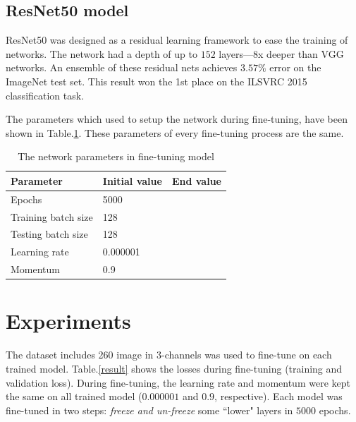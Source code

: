 \documentclass[12pt,a4paper]{article}
\begin{document}
\subsection{ResNet50 model}
ResNet50\cite{he2015deep} was designed as a residual learning framework to ease the training of networks. The network had a depth of up to $152$ layers---$8$x deeper than VGG networks. An ensemble of these residual nets achieves $3.57\%$ error on the ImageNet test set. This result won the 1st place on the ILSVRC 2015 classification task.

The parameters which used to setup the network during fine-tuning, have been shown in Table.\ref{model2parameters}. These parameters of every fine-tuning process are the same.
\begin{table}[h!]
	\centering
	\begin{tabular}{l l l}
	Parameter & Initial value & End value \\ \hline
	Epochs & 5000 &  \\ \hline
	Training batch size & 128 & \\ \hline
	Testing batch size & 128 & \\ \hline
	Learning rate & 0.000001 &  \\ \hline
	Momentum & 0.9 &  \\ \hline
	\end{tabular}
	\caption{The network parameters in fine-tuning model}
	\label{model2parameters}
\end{table}
\section{Experiments}
The dataset includes 260 image in 3-channels was used to fine-tune on each trained model. Table.\ref{result} shows the losses during fine-tuning (training and validation loss). During fine-tuning, the learning rate and momentum were kept the same on all trained model ($0.000001$ and $0.9$, respective). Each model was fine-tuned in two steps: \textit{freeze and un-freeze} some ``lower" layers in $5000$ epochs.
\end{document}
